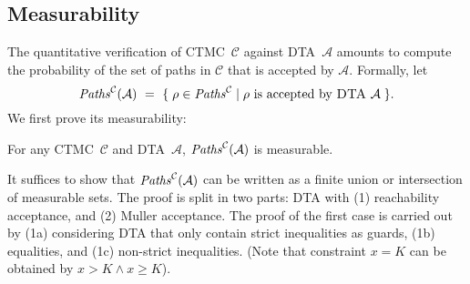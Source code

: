 \documentclass{LMCS}
\newcommand{\mc}[1]{\mathcal{#1}}
\newcommand{\<}{\langle}
\renewcommand{\>}{\rangle}
\newcommand{\mC}{\mathcal{C}}
\newcommand{\mA}{\mathcal{A}}
\newcommand{\CTMC}{\textsc{{CTMC}}}
\newcommand{\DTA}{\textsc{DTA}}
\newcommand{\Paths}{{\it Paths}}
\begin{document}
\subsection{Measurability}
The quantitative verification of \CTMC\ $\mC$ against \DTA\ $\mA$ amounts to
compute the probability of the set of paths in $\mC$ that is accepted by $\mA$.
Formally, let
\[
\Paths^{\mc{C}}(\mc{A}) \ = \
\{\; \rho\in\Paths^{\mc{C}} \mid \rho \mbox{ is }\mbox{accepted} \mbox{ by }
\DTA\ \mc{A}\;\}.
\]
We first prove its measurability:

\begin{thm}\label{lem:measurability}
For any \CTMC\ $\mc{C}$ and \DTA\ $\mc{A}$, $\Paths^{\mc{C}}(\mc{A})$ is measurable.
\end{thm}

\proof
It suffices to show that $\Paths^{\mc{C}}(\mc{A})$ can be written as a finite union or
intersection of measurable sets.
The proof is split in two parts: DTA with (1) reachability acceptance, and (2) Muller acceptance.
The proof of the first case is carried out by (1a) considering DTA that only contain strict
inequalities as guards, (1b) equalities, and (1c) non-strict inequalities.
(Note that constraint $x = K$ can be obtained by $x > K \wedge x \geq K$).
\end{document}
